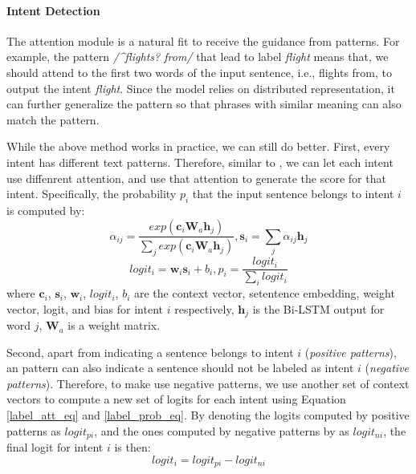 \paragraph{Intent Detection}
The attention module is a natural fit to receive the guidance from \RE patterns. For example, the pattern \textsl{/\textasciicircum flights? from/} that lead to label \emph{flight} means that, we should attend to the first two words of the input sentence, i.e., flights from, to output the intent \emph{flight}. Since the \NN model relies on distributed representation, it can further generalize the pattern so that phrases with similar meaning can also match the pattern.

While the above method works in practice, we can still do better. First, every intent has different text patterns. Therefore, similar to \cite{lin2016neural}, we can let each intent use diffenrent attention, and use that attention to generate the score for that intent. Specifically, the probability $p_i$ that the input sentence belongs to intent $i$ is computed by:
\begin{equation}
\alpha_{ij}=\frac{exp(\textbf{c}_i\textbf{W}_a\textbf{h}_j)}{\sum_{j}{exp(\textbf{c}_i\textbf{W}_a\textbf{h}_j)}}, 
\textbf{s}_i = \sum_{j}{\alpha_{ij}\textbf{h}_j}
\label{label_att_eq}
\end{equation}
\begin{equation}
logit_i=\textbf{w}_i\textbf{s}_i + b_i, p_i = \frac{logit_i}{\sum_{i}{logit_i}}
\label{label_prob_eq}
\end{equation}
where $\textbf{c}_i$, $\textbf{s}_i$, $\textbf{w}_i$, $logit_i$, $b_i$ are the context vector, setentence embedding, weight vector, logit, and bias for intent $i$ respectively, $\textbf{h}_j$ is the Bi-LSTM output for word $j$, $\textbf{W}_a$ is a weight matrix.

Second, apart from indicating a sentence belongs to intent $i$ (\emph{positive patterns}), an \RE pattern can also indicate a sentence should not be labeled as intent $i$ (\emph{negative patterns}). Therefore, to make use negative patterns, we use another set of context vectors to compute a new set of logits for each intent using Equation \ref{label_att_eq} and \ref{label_prob_eq}. By denoting the logits computed by positive patterns as $logit_{pi}$, and the ones computed by negative patterns by as $logit_{ni}$, the final logit for intent $i$ is then: 
\begin{equation}
logit_i = logit_{pi} - logit_{ni}
\end{equation}

